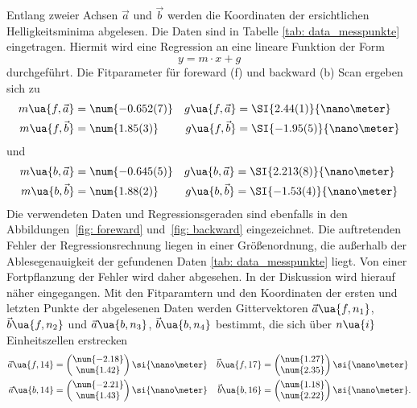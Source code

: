 Entlang zweier Achsen $\vec{a}$ und $\vec{b}$ werden die Koordinaten der ersichtlichen Helligkeitsminima
abgelesen. Die Daten sind in Tabelle \ref{tab: data_messpunkte} eingetragen. Hiermit wird eine Regression an eine
lineare Funktion der Form
\begin{equation}
  y = m \cdot x + g
\end{equation}
durchgeführt. Die Fitparameter für foreward (f) und backward (b) Scan ergeben sich zu
\begin{align}
  m\ua{f, \vec{a}} &= \num{-0.652(7)} & g\ua{f, \vec{a}} &= \SI{2.44(1)}{\nano\meter} \\
  m\ua{f, \vec{b}} &= \num{1.85(3)} & g\ua{f, \vec{b}} &= \SI{-1.95(5)}{\nano\meter}
\end{align}
und
\begin{align}
  m\ua{b, \vec{a}} &= \num{-0.645(5)} & g\ua{b, \vec{a}} &= \SI{2.213(8)}{\nano\meter} \\
  m\ua{b, \vec{b}} &= \num{1.88(2)}   & g\ua{b, \vec{b}} &= \SI{-1.53(4)}{\nano\meter}
\end{align}
Die verwendeten Daten und Regressionsgeraden sind ebenfalls in den Abbildungen~\ref{fig: foreward}
und~\ref{fig: backward} eingezeichnet.
Die auftretenden Fehler der Regressionsrechnung liegen in einer Größenordnung, die außerhalb der Ablesegenauigkeit der
gefundenen Daten \ref{tab: data_messpunkte} liegt. Von einer Fortpflanzung der Fehler wird daher abgesehen. In der Diskussion
wird hierauf näher eingegangen.
Mit den Fitparamtern und den Koordinaten der ersten und letzten Punkte der abgelesenen Daten werden Gittervektoren $\vec{a}\ua{f, n_1}$, $\vec{b}\ua{f, n_2}$ und
$\vec{a}\ua{b, n_3}$, $\vec{b}\ua{b, n_4}$ bestimmt, die sich über $n\ua{i}$ Einheitszellen erstrecken
\begin{align}
  \vec{a}\ua{f, 14} &= \begin{pmatrix} \num{-2.18} \\  \num{1.42} \end{pmatrix}\si{\nano\meter} & \vec{b}\ua{f, 17}   &= \begin{pmatrix} \num{1.27} \\ \num{2.35} \end{pmatrix} \si{\nano\meter}\\
  \vec{a}\ua{b, 14} &= \begin{pmatrix}  \num{-2.21} \\ \num{1.43} \end{pmatrix}\si{\nano\meter} &  \vec{b}\ua{b, 16} &= \begin{pmatrix} \num{1.18} \\ \num{2.22} \end{pmatrix} \si{\nano\meter}.
\end{align}
